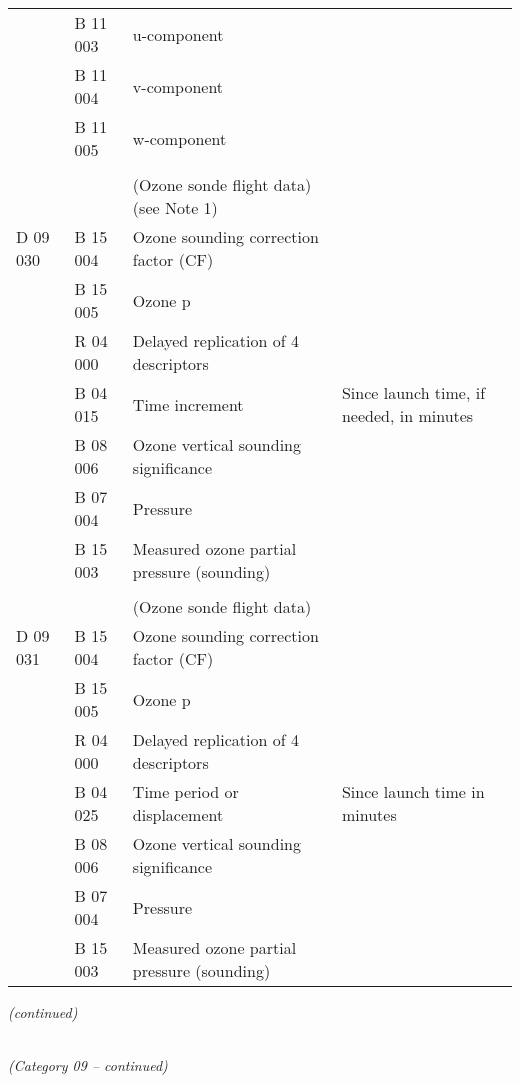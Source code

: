 \begin{longtable}[]{@{}llll@{}}
& B 11 003 & u-component &\tabularnewline
& B 11 004 & v-component &\tabularnewline
& B 11 005 & w-component &\tabularnewline
& & &\tabularnewline
& & (Ozone sonde flight data) (see Note 1) &\tabularnewline
D 09 030 & B 15 004 & Ozone sounding correction factor (CF) &\tabularnewline
& B 15 005 & Ozone p &\tabularnewline
& R 04 000 & Delayed replication of 4 descriptors &\tabularnewline
& B 04 015 & Time increment & Since launch time, if needed, in minutes\tabularnewline
& B 08 006 & Ozone vertical sounding significance &\tabularnewline
& B 07 004 & Pressure &\tabularnewline
& B 15 003 & Measured ozone partial pressure (sounding) &\tabularnewline
& & &\tabularnewline
& & (Ozone sonde flight data) &\tabularnewline
D 09 031 & B 15 004 & Ozone sounding correction factor (CF) &\tabularnewline
& B 15 005 & Ozone p &\tabularnewline
& R 04 000 & Delayed replication of 4 descriptors &\tabularnewline
& B 04 025 & Time period or displacement & Since launch time in minutes\tabularnewline
& B 08 006 & Ozone vertical sounding significance &\tabularnewline
& B 07 004 & Pressure &\tabularnewline
& B 15 003 & Measured ozone partial pressure (sounding) &\tabularnewline
\bottomrule
\end{longtable}

\emph{(continued)}

\emph{\\
(Category 09 -- continued)}


